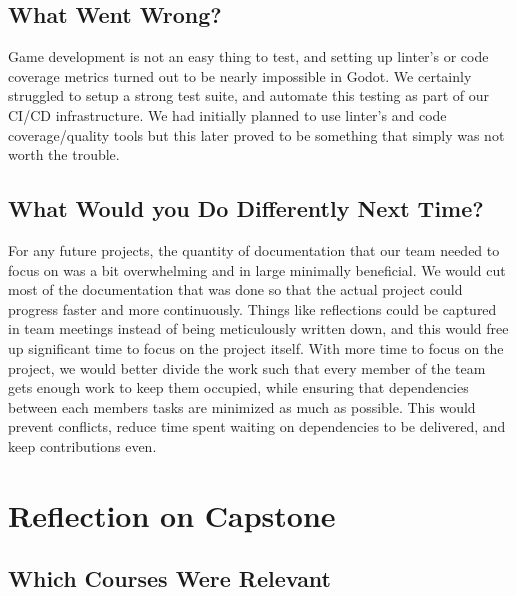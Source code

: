 \documentclass{article}
\begin{document}
\subsection{What Went Wrong?}


Game development is not an easy thing to test, and setting up linter's or code coverage metrics turned out to be nearly impossible in Godot. We certainly struggled to setup a strong test suite, and automate this testing as part of our CI/CD infrastructure. We had initially planned to use linter's and code coverage/quality tools but this later proved to be something that simply was not worth the trouble. 

\subsection{What Would you Do Differently Next Time?}


For any future projects, the quantity of documentation that our team needed to focus on was a bit overwhelming and in large minimally beneficial. We would cut most of the documentation that was done so that the actual project could progress faster and more continuously. Things like reflections could be captured in team meetings instead of being meticulously written down, and this would free up significant time to focus on the project itself. With more time to focus on the project, we would better divide the work such that every member of the team gets enough work to keep them occupied, while ensuring that dependencies between each members tasks are minimized as much as possible. This would prevent conflicts, reduce time spent waiting on dependencies to be delivered, and keep contributions even.

\section{Reflection on Capstone}


\subsection{Which Courses Were Relevant}

\end{document}
